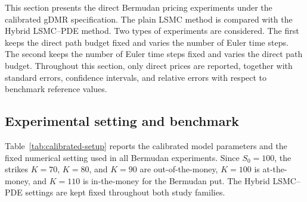 \documentclass[pdflatex,sn-mathphys-num]{sn-jnl}
\theoremstyle{thmstyleone}%
\theoremstyle{thmstylethree}%
\theoremstyle{thmstyletwo}%
\begin{document}
This section presents the direct Bermudan pricing experiments under the calibrated gDMR specification. The plain LSMC method \cite{longstaff2001valuing} is compared with the Hybrid LSMC--PDE method. Two types of experiments are considered. The first keeps the direct path budget fixed and varies the number of Euler time steps. The second keeps the number of Euler time steps fixed and varies the direct path budget. Throughout this section, only direct prices are reported, together with standard errors, confidence intervals, and relative errors with respect to benchmark reference values.

\subsection{Experimental setting and benchmark}

Table~\ref{tab:calibrated-setup} reports the calibrated model parameters and the fixed numerical setting used in all Bermudan experiments. Since \(S_0 = 100\), the strikes \(K = 70\), \(K = 80\), and \(K = 90\) are out-of-the-money, \(K = 100\) is at-the-money, and \(K = 110\) is in-the-money for the Bermudan put. The Hybrid LSMC--PDE settings are kept fixed throughout both study families.
\end{document}
